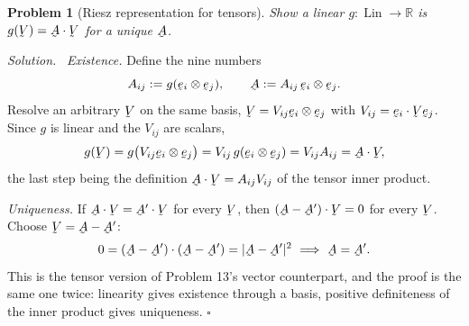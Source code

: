 \documentclass[17pt,a4paper]{extreport}
\DeclareRobustCommand{\vek}[1]{\underaccent{\tilde}{#1}}
\newcommand{\Rn}{\mathbb{R}}
\newcommand{\Lin}{\operatorname{Lin}}
\newcommand{\be}{\vek{e}}
\newcommand{\bA}{\vek{A}}
\newcommand{\bV}{\vek{V}}
\newcommand{\ip}[2]{#1\cdot#2}
\theoremstyle{scplain}
\theoremstyle{scdefn}
\theoremstyle{scplain}
\newtheorem{problem}{Problem}
\newenvironment{solution}
 {\par\smallskip\noindent\textit{Solution.}\ }
 {\hfill$\square$\par\medskip}
\begin{document}
\begin{problem}[Riesz representation for tensors]
Show a linear $g:\Lin\to\Rn$ is $g(\bV)=\bA\cdot\bV$ for a unique $\bA$.
\end{problem}
\begin{solution}
\emph{Existence.} Define the nine numbers
\[
   A_{ij}:=g(\be_i\otimes\be_j),\qquad
   \bA:=A_{ij}\,\be_i\otimes\be_j .
\]
Resolve an arbitrary $\bV$ on the same basis,
$\bV=V_{ij}\be_i\otimes\be_j$ with $V_{ij}=\ip{\be_i}{\bV\be_j}$. Since
$g$ is linear and the $V_{ij}$ are scalars,
\[
   g(\bV)=g\big(V_{ij}\be_i\otimes\be_j\big)
        =V_{ij}\,g(\be_i\otimes\be_j)
        =V_{ij}A_{ij}=\bA\cdot\bV ,
\]
the last step being the definition $\bA\cdot\bV=A_{ij}V_{ij}$ of the
tensor inner product.

\emph{Uniqueness.} If $\bA\cdot\bV=\bA'\cdot\bV$ for every $\bV$, then
$(\bA-\bA')\cdot\bV=0$ for every $\bV$. Choose $\bV=\bA-\bA'$:
\[
   0=(\bA-\bA')\cdot(\bA-\bA')=|\bA-\bA'|^{2}
   \ \Longrightarrow\ \bA=\bA' .
\]
This is the tensor version of Problem 13's vector counterpart, and the
proof is the same one twice: linearity gives existence through a basis,
positive definiteness of the inner product gives uniqueness.
\end{solution}
\end{document}
